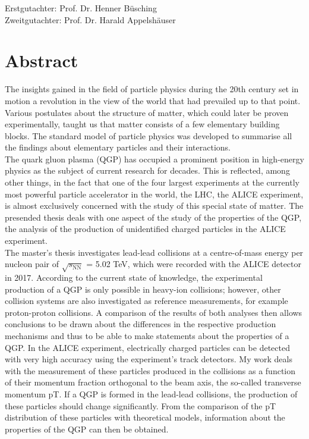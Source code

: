 \documentclass[12pt,a4paper]{report}
\begin{document}
\vspace*{22cm}
\large{Erstgutachter: Prof. Dr. Henner Büsching}\\
\large{Zweitgutachter: Prof. Dr. Harald Appelshäuser}
\normalsize
{}
\newpage
\tableofcontents
\newpage

\setcounter{chapter}{-1}
\chapter{Abstract}
The insights gained in the field of particle physics during the 20th century set in motion a revolution in the view of the world that had prevailed up to that point. Various postulates about the structure of matter, which could later be proven experimentally, taught us that matter consists of a few elementary building blocks. The standard model of particle physics was developed to summarise all the findings about elementary particles and their interactions.\\
The quark gluon plasma (QGP) has occupied a prominent position in high-energy physics as the subject of current research for decades. This is reflected, among other things, in the fact that one of the four largest experiments at the currently most powerful particle accelerator in the world, the LHC, the ALICE experiment, is almost exclusively concerned with the study of this special state of matter. The presended thesis deals with one aspect of the study of the properties of the QGP, the analysis of the production of unidentified charged particles in the ALICE experiment.\\
The master's thesis investigates lead-lead collisions at a centre-of-mass energy per nucleon pair of $\sqrt{s_\text{NN}}$ = 5.02 TeV, which were recorded with the ALICE detector in 2017. According to the current state of knowledge, the experimental production of a QGP is only possible in heavy-ion collisions; however, other collision systems are also investigated as reference measurements, for example proton-proton collisions. A comparison of the results of both analyses then allows conclusions to be drawn about the differences in the respective production mechanisms and thus to be able to make statements about the properties of a QGP. In the ALICE experiment, electrically charged particles can be detected with very high accuracy using the experiment's track detectors. My work deals with the measurement of these particles produced in the collisions as a function of their momentum fraction orthogonal to the beam axis, the so-called transverse momentum pT. If a QGP is formed in the lead-lead collisions, the production of these particles should change significantly. From the comparison of the pT distribution of these particles with theoretical models, information about the properties of the QGP can then be obtained.\\
\end{document}
